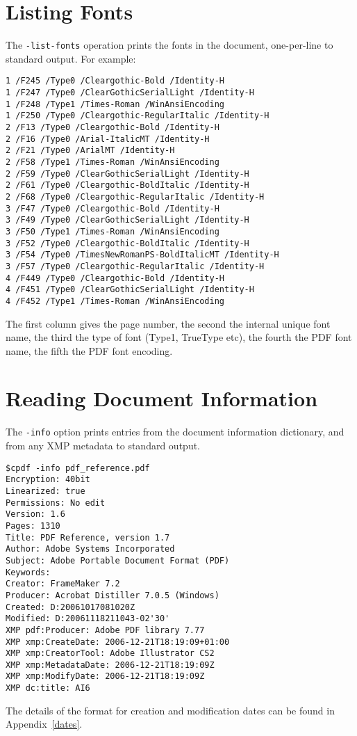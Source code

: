 \documentclass{book}
\begin{document}
  \section{Listing Fonts}
  The \texttt{-list-fonts} operation prints the fonts in the document,
one-per-line to standard output. For example:
\begin{framed}\small\begin{verbatim}1 /F245 /Type0 /Cleargothic-Bold /Identity-H
1 /F247 /Type0 /ClearGothicSerialLight /Identity-H
1 /F248 /Type1 /Times-Roman /WinAnsiEncoding
1 /F250 /Type0 /Cleargothic-RegularItalic /Identity-H
2 /F13 /Type0 /Cleargothic-Bold /Identity-H
2 /F16 /Type0 /Arial-ItalicMT /Identity-H
2 /F21 /Type0 /ArialMT /Identity-H
2 /F58 /Type1 /Times-Roman /WinAnsiEncoding
2 /F59 /Type0 /ClearGothicSerialLight /Identity-H
2 /F61 /Type0 /Cleargothic-BoldItalic /Identity-H
2 /F68 /Type0 /Cleargothic-RegularItalic /Identity-H
3 /F47 /Type0 /Cleargothic-Bold /Identity-H
3 /F49 /Type0 /ClearGothicSerialLight /Identity-H
3 /F50 /Type1 /Times-Roman /WinAnsiEncoding
3 /F52 /Type0 /Cleargothic-BoldItalic /Identity-H
3 /F54 /Type0 /TimesNewRomanPS-BoldItalicMT /Identity-H
3 /F57 /Type0 /Cleargothic-RegularItalic /Identity-H
4 /F449 /Type0 /Cleargothic-Bold /Identity-H
4 /F451 /Type0 /ClearGothicSerialLight /Identity-H
4 /F452 /Type1 /Times-Roman /WinAnsiEncoding
\end{verbatim}
\end{framed}

\noindent The first column gives the page number, the second the internal unique font
name, the third the type of font (Type1, TrueType etc), the fourth the PDF font
name, the fifth the PDF font encoding.
 
\section{Reading Document Information}
\label{info}
The \texttt{-info} option prints entries from the document information
dictionary, and from any XMP metadata to standard output.

\begin{framed}
{\small\begin{verbatim}
$cpdf -info pdf_reference.pdf
Encryption: 40bit
Linearized: true
Permissions: No edit
Version: 1.6
Pages: 1310
Title: PDF Reference, version 1.7
Author: Adobe Systems Incorporated
Subject: Adobe Portable Document Format (PDF)
Keywords: 
Creator: FrameMaker 7.2
Producer: Acrobat Distiller 7.0.5 (Windows)
Created: D:20061017081020Z
Modified: D:20061118211043-02'30'
XMP pdf:Producer: Adobe PDF library 7.77
XMP xmp:CreateDate: 2006-12-21T18:19:09+01:00
XMP xmp:CreatorTool: Adobe Illustrator CS2
XMP xmp:MetadataDate: 2006-12-21T18:19:09Z
XMP xmp:ModifyDate: 2006-12-21T18:19:09Z
XMP dc:title: AI6\end{verbatim}}\end{framed}
\noindent The details of the format for creation and modification dates can be found in
Appendix~\ref{dates}.
\end{document}
